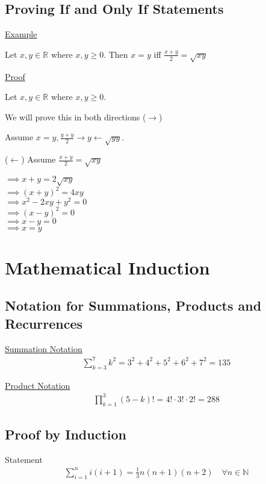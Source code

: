 \documentclass{article}
\begin{document}
\subsection{Proving If and Only If Statements}

\underline{Example}

Let $x,y \in \mathbb{R}$ where $x,y \ge 0$. Then $x = y$ iff $\frac{x+y}{2} = \sqrt{xy}$

\underline{Proof}

Let $x,y \in \mathbb{R}$ where $x,y \ge 0$. 

We will prove this in both directions ($\rightarrow$)

Assume $x=y, \frac{y+y}{2} \rightarrow y \leftarrow \sqrt{yy}$.

($\leftarrow$) Assume $\frac{x+y}{2} = \sqrt{xy}$

$\implies x + y = 2\sqrt{xy}$\\
$\implies (x+y)^2 = 4xy$\\
$\implies x^2 - 2xy+y^2=0$\\
$\implies (x-y)^2 = 0$\\
$\implies x-y = 0$\\
$\implies x = y$


\section{Mathematical Induction}


\subsection{Notation for Summations, Products and Recurrences}

\underline{Summation Notation}
\begin{align*}
    \sum_{k=3}^{7}k^2 = 3^2 + 4^2 + 5^2 + 6^2 + 7^2 = 135
\end{align*}

\underline{Product Notation}
\begin{align*}
    \prod_{k=1}^{3}(5-k)! = 4! \cdot 3! \cdot 2! = 288
\end{align*}

\subsection{Proof by Induction}

Statement
\begin{align*}
    \sum_{i=1}^{n}i(i+1) = \frac{1}{3}n(n+1)(n+2) \quad \forall n \in \mathbb{N}
\end{align*}
\end{document}
